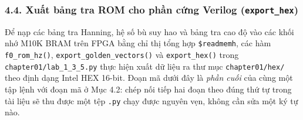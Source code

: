 \documentclass[11pt,a4paper]{article}
\begin{document}
\subsubsection*{4.4. Xuất bảng tra ROM cho phần cứng Verilog (\texttt{export\_hex})}

Để nạp các bảng tra Hanning, hệ số bù suy hao và bảng tra cao độ vào các khối nhớ M10K BRAM trên FPGA bằng chỉ thị tổng hợp \texttt{\$readmemh}, các hàm \texttt{f0\_rom\_hz()}, \texttt{export\_golden\_vectors()} và \texttt{export\_hex()} trong \texttt{chapter01/lab\_1\_3\_5.py} thực hiện xuất dữ liệu ra thư mục \texttt{chapter01/hex/} theo định dạng Intel HEX 16-bit. Đoạn mã dưới đây là \emph{phần cuối} của cùng một tập lệnh với đoạn mã ở Mục 4.2: chép nối tiếp hai đoạn theo đúng thứ tự trong tài liệu sẽ thu được một tệp \texttt{.py} chạy được nguyên vẹn, không cần sửa một ký tự nào.
\end{document}
